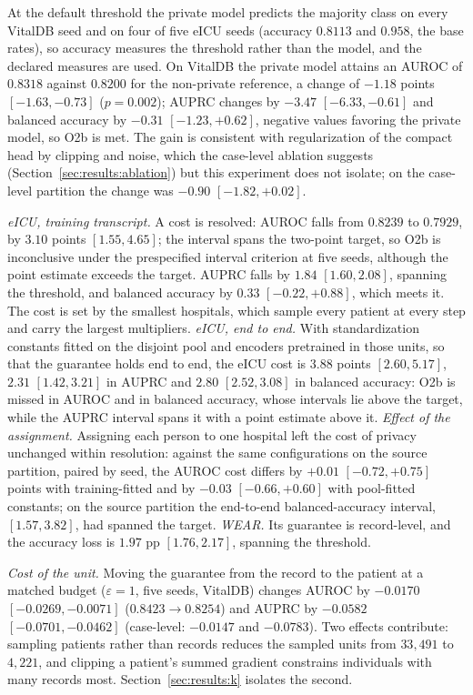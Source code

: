 At the default threshold the private model predicts the majority class on
every VitalDB seed and on four of five eICU seeds (accuracy $0.8113$ and
$0.958$, the base rates), so accuracy measures the threshold rather than the model, and the
declared measures are used. On VitalDB the private model attains an AUROC of
$0.8318$ against $0.8200$ for the non-private reference, a change of $-1.18$
points $[-1.63, -0.73]$ ($p = 0.002$); AUPRC changes by $-3.47$
$[-6.33, -0.61]$ and balanced accuracy by $-0.31$ $[-1.23, +0.62]$, negative
values favoring the private model, so O2b is met. The gain is consistent with
regularization of the compact head by clipping and noise, which the
case-level ablation suggests (Section~\ref{sec:results:ablation}) but this
experiment does not isolate; on the
case-level partition the change was $-0.90$ $[-1.82, +0.02]$.

\emph{eICU, training transcript.} A cost is resolved: AUROC falls from
$0.8239$ to $0.7929$, by $3.10$ points $[1.55, 4.65]$; the interval spans the
two-point target, so O2b is inconclusive under the prespecified interval
criterion at five seeds, although the point estimate exceeds the target. AUPRC falls by $1.84$ $[1.60, 2.08]$, spanning the
threshold, and balanced accuracy by $0.33$ $[-0.22, +0.88]$, which meets it.
The cost is set by the smallest hospitals, which sample every patient at every
step and carry the largest multipliers.
\emph{eICU, end to end.} With standardization constants
fitted on the disjoint pool and encoders pretrained in those units, so that
the guarantee holds end to end, the eICU cost is $3.88$ points
$[2.60, 5.17]$, $2.31$ $[1.42, 3.21]$ in AUPRC and $2.80$ $[2.52, 3.08]$ in
balanced accuracy: O2b is missed in AUROC and in balanced accuracy, whose
intervals lie above the target, while the AUPRC interval spans it with a point
estimate above it. \emph{Effect of the assignment.} Assigning each person to one hospital left the cost of
privacy unchanged within resolution: against the same configurations on the source
partition, paired by seed, the AUROC cost differs by $+0.01$ $[-0.72, +0.75]$
points with training-fitted and by $-0.03$ $[-0.66, +0.60]$ with pool-fitted
constants; on the source partition the end-to-end balanced-accuracy interval,
$[1.57, 3.82]$, had spanned the target. \emph{WEAR.} Its guarantee is
record-level, and the accuracy loss is $1.97$ pp $[1.76, 2.17]$, spanning the
threshold.

\emph{Cost of the unit.} Moving the guarantee from the record to the patient
at a matched budget ($\varepsilon = 1$, five seeds, VitalDB) changes AUROC by
$-0.0170$ $[-0.0269, -0.0071]$ ($0.8423 \rightarrow 0.8254$) and AUPRC by
$-0.0582$ $[-0.0701, -0.0462]$ (case-level: $-0.0147$ and $-0.0783$). Two effects
contribute: sampling patients rather than records reduces the sampled units
from $33{,}491$ to $4{,}221$, and clipping a patient's summed gradient constrains
individuals with many records most. Section~\ref{sec:results:k} isolates the
second.

